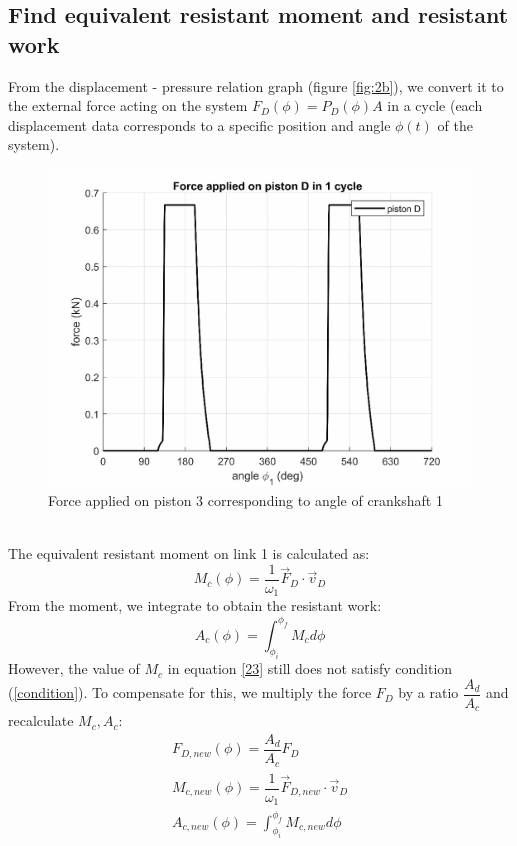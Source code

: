 \subsection{Find equivalent resistant moment and resistant work}
From the displacement - pressure  relation graph (figure \ref{fig:2b}), we convert it to the external force acting on the system $ F_D(\phi)=P_D(\phi) A $ in a cycle (each displacement data corresponds to a specific position and angle $ \phi(t) $ of the system).
\begin{figure}[h]
	\centering
	\includegraphics[width=0.7\linewidth]{15}
	\caption{Force applied on piston 3 corresponding to angle of crankshaft 1}
	\label{fig:15}
\end{figure}\\
The equivalent resistant moment on link 1 is calculated as:
\begin{equation}\label{23}
M_c(\phi)=\dfrac{1}{\omega_1}\vec{F}_D\cdot\vec{v}_D
\end{equation}
From the moment, we integrate to obtain the resistant work:
\begin{equation}\label{24}
A_c(\phi)=\int_{\phi_i}^{\phi_f}M_c d\phi
\end{equation}
However, the value of $ M_c $ in equation \ref{23} still does not satisfy condition (\ref{condition}). To compensate for this, we multiply the force $ F_D $ by a ratio $ \dfrac{A_d}{A_c} $ and recalculate $ M_c, A_c $:
\begin{equation}
\begin{array}{l}
F_{D,new}(\phi)=\dfrac{A_d}{A_c}F_D\\
M_{c,new}(\phi)=\dfrac{1}{\omega_1}\vec{F}_{D,new}\cdot\vec{v}_D\\
\displaystyle A_{c,new}(\phi)=\int_{\phi_i}^{\phi_f}M_{c,new} d\phi
\end{array}
\end{equation}\clearpage
